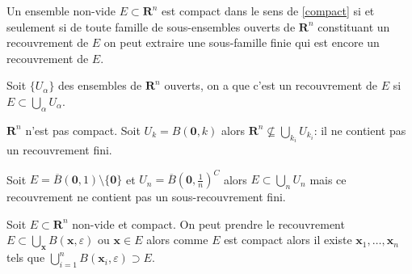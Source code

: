 \begin{theorem} 
Un ensemble non-vide $E\subset \mathbf{R}^{n}$ est compact dans le sens de \ref{compact} si et seulement si de toute famille de sous-ensembles ouverts de $\mathbf{R}^{n}$ constituant un recouvrement de $E$ on peut extraire une sous-famille finie qui est encore un recouvrement de $E$. 
\end{theorem}

Soit $\{ U_{\alpha} \}$ des ensembles de $\mathbf{R}^{n}$ ouverts, on a que c'est un recouvrement de $E$ si $E\subset\bigcup _{\alpha}U_{\alpha}$.
\begin{example}
$\mathbf{R}^{n}$ n'est pas compact. Soit $U_{k}=B(\boldsymbol{0},k)$ alors $\mathbf{R}^{n}\not\subseteq\bigcup _{k_{i}}U_{k_{i}}$: il ne contient pas un recouvrement fini.
\end{example}
\begin{example}
Soit $E=\overline{B}(\boldsymbol{0},1)\setminus \{ \boldsymbol{0} \}$ et $U_{n}=\overline{B}\left( \boldsymbol{0}, \frac{1}{n} \right)^{C}$ alors $E\subset \bigcup _{n}U_{n}$ mais ce recouvrement ne contient pas un sous-recouvrement fini.
\end{example}
\begin{example}
Soit $E\subset \mathbf{R}^{n}$ non-vide et compact. On peut prendre le recouvrement $E\subset \bigcup _{\boldsymbol{x}}B(\boldsymbol{x},\varepsilon)$ ou $\boldsymbol{x}\in E$ alors comme $E$ est compact alors il existe $\boldsymbol{x}_{1},\dots,\boldsymbol{x}_{n}$ tels que $\bigcup _{i=1}^{n}B(\boldsymbol{x}_{i},\varepsilon)\supset E$.
\end{example}

